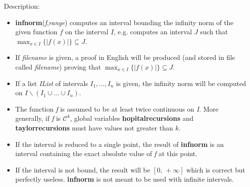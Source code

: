 \noindent Description: \begin{itemize}

\item \textbf{infnorm}(\emph{f},\emph{range}) computes an interval bounding the infinity norm of the 
   given function $f$ on the interval $I$, e.g. computes an interval $J$
   such that $\max_{x \in I} \{|f(x)|\} \subseteq J$.

\item If \emph{filename} is given, a proof in English will be produced (and stored in file
   called \emph{filename}) proving that  $\max_{x \in I} \{|f(x)|\} \subseteq J$.

\item If a list \emph{IList} of intervals $I_1, \dots, I_n$ is given, the infinity norm will
   be computed on $I \backslash (I_1 \cup \dots \cup I_n)$.

\item The function \emph{f} is assumed to be at least twice continuous on \emph{I}. More 
   generally, if \emph{f} is $\mathcal{C}^k$, global variables \textbf{hopitalrecursions} and
   \textbf{taylorrecursions} must have values not greater than $k$.  

\item If the interval is reduced to a single point, the result of \textbf{infnorm} is an 
   interval containing the exact absolute value of \emph{f} at this point.

\item If the interval is not bound, the result will be $[0,\,+\infty]$ 
   which is correct but perfectly useless. \textbf{infnorm} is not meant to be used with 
   infinite intervals.


\end{itemize}
